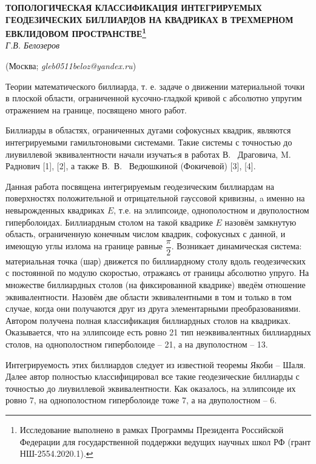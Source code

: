 \begin{center}
    {\bf ТОПОЛОГИЧЕСКАЯ КЛАССИФИКАЦИЯ ИНТЕГРИРУЕМЫХ ГЕОДЕЗИЧЕСКИХ БИЛЛИАРДОВ НА КВАДРИКАХ В ТРЕХМЕРНОМ ЕВКЛИДОВОМ ПРОСТРАНСТВЕ\footnote{Исследование выполнено в рамках Программы Президента Российской Федерации для государственной поддержки ведущих научных школ РФ (грант НШ-2554.2020.1).}}\\

    {\it Г.В. Белозеров}

    (Москва; {\it gleb0511beloz@yandex.ru})
\end{center}


Теории математического биллиарда, т. е. задаче о движении материальной
точки в плоской области, ограниченной кусочно-гладкой кривой с абсолютно
упругим отражением на границе, посвящено много работ.

Биллиарды в областях, ограниченных дугами софокусных квадрик, являются интегрируемыми гамильтоновыми системами.
Такие системы с точностью до лиувиллевой эквивалентности начали изучатьcя
в работах В.~ Драговича, M.~ Раднович [1], [2], а также В.\, В.~ Ведюшкиной (Фокичевой)  [3], [4].

Данная работа посвящена интегрируемым  геодезическим биллиардам на поверхностях положительной и отрицательной гауссовой
кривизны,  a именно на невырожденных квадриках $E$, т.е. на эллипсоиде, однополостном и двуполостном гиперболоидах.
Биллиардным столом на такой квадрике $E$ назовём замкнутую область,
ограниченную конечным числом квадрик, софокусных с данной, и имеющую углы излома на границе равные
$\dfrac{\pi}{2}$. Возникает динамическая система:
материальная точка (шар) движется по биллиардному столу
вдоль геодезических с постоянной по модулю скоростью, отражаясь от границы абсолютно упруго. На
множестве биллиардных столов (на фиксированной квадрике) введём отношение эквивалентности.
Назовём две области эквивалентными
в том и только в том случае, когда они получаются друг из друга  элементарными преобразованиями.
Автором получена полная классификация  биллиардных столов на квадриках. Оказывается, что
на эллипсоиде есть ровно 21 тип неэквивалентных биллиардных столов, на однополостном гиперболоиде -- 21, а на двуполостном -- 13.


Интегрируемость этих биллиардов  следует из известной теоремы Якоби -- Шаля.
Далее автор полностью классифицировал  все такие геодезические биллиарды с
точностью до лиувиллевой эквивалентности. Как оказалось, на эллипсоиде их ровно 7, на однополостном гиперболоиде  тоже 7, а на двуполостном -- 6.

